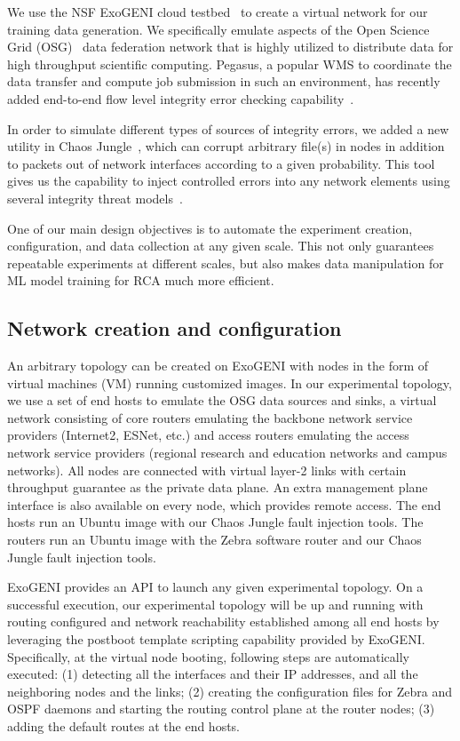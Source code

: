 We use the NSF ExoGENI cloud testbed~\cite{ExoGENI:web} to create a virtual network for our training data generation. We specifically emulate aspects of the Open Science Grid (OSG)~\cite{OSG:web} data federation network that is highly utilized to distribute data for high throughput scientific computing. Pegasus, a popular WMS to coordinate the data transfer and compute job submission in such an environment, has recently added end-to-end flow level integrity error checking capability~\cite{swip:pearc:2019}.    

In order to simulate different types of sources of integrity errors, we added a new utility in Chaos Jungle~\cite{swip:pearc:2019,chaosjungle:web}, which can corrupt arbitrary file(s) in nodes in addition to packets out of network interfaces according to a given probability. This tool gives us the capability to inject controlled errors into any network elements using several integrity threat models~\cite{threat-model}.

One of our main design objectives is to automate the experiment creation, configuration, and data collection at any given scale. This not only guarantees repeatable experiments at different scales, but also makes data manipulation for ML model training for RCA much more efficient.    

\subsection{Network creation and configuration}
An arbitrary topology can be created on ExoGENI with nodes in the form of virtual machines (VM) running customized images. In our experimental topology, we use a set of end hosts to emulate the OSG data sources and sinks, a virtual network consisting of core routers emulating the backbone network service providers (Internet2, ESNet, etc.) and access routers emulating the access network service providers (regional research and education networks and campus networks). All nodes are connected with virtual layer-2 links with certain throughput guarantee as the private data plane. An extra management plane interface is also available on every node, which provides remote access. The end hosts run an Ubuntu image with our Chaos Jungle fault injection tools. The routers run an Ubuntu image with the Zebra software router and our Chaos Jungle fault injection tools.

ExoGENI provides an API to launch any given experimental topology. On a successful execution, our experimental topology will be up and running with routing configured and network reachability established among all end hosts by leveraging the postboot template scripting capability provided by ExoGENI. Specifically, at the virtual node booting, following steps are automatically executed: (1) detecting all the interfaces and their IP addresses, and all the neighboring nodes and the links; (2) creating the configuration files for Zebra and OSPF daemons and starting the routing control plane at the router nodes; (3) adding the default routes at the end hosts.    

